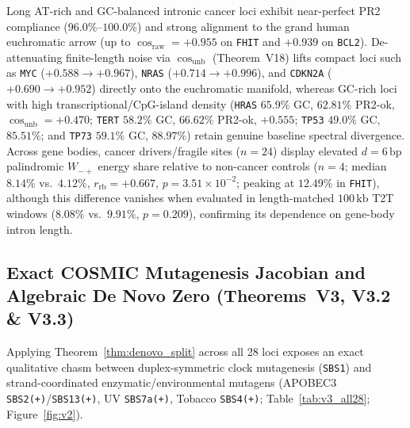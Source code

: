 \documentclass[11pt, a4paper]{article}
\DeclareRobustCommand{\_}{\textunderscore\allowbreak}
\begin{document}
Long AT-rich and GC-balanced intronic cancer loci exhibit near-perfect PR2 compliance ($96.0\%\text{--}100.0\%$) and strong alignment to the grand human euchromatic arrow (up to $\cos_{\mathrm{raw}} = +0.955$ on \texttt{FHIT} and $+0.939$ on \texttt{BCL2}). De-attenuating finite-length noise via $\cos_{\mathrm{unb}}$ (Theorem~V18) lifts compact loci such as \texttt{MYC} ($+0.588 \to +0.967$), \texttt{NRAS} ($+0.714 \to +0.996$), and \texttt{CDKN2A} ($+0.690 \to +0.952$) directly onto the euchromatic manifold, whereas GC-rich loci with high transcriptional/CpG-island density (\texttt{HRAS} $65.9\%$ GC, $62.81\%$ PR2-ok, $\cos_{\mathrm{unb}} = +0.470$; \texttt{TERT} $58.2\%$ GC, $66.62\%$ PR2-ok, $+0.555$; \texttt{TP53} $49.0\%$ GC, $85.51\%$; and \texttt{TP73} $59.1\%$ GC, $88.97\%$) retain genuine baseline spectral divergence. Across gene bodies, cancer drivers/fragile sites ($n = 24$) display elevated $d = 6\,\mathrm{bp}$ palindromic $W_{-+}$ energy share relative to non-cancer controls ($n = 4$; median $8.14\%$ vs.\ $4.12\%$, $r_{\mathrm{rb}} = +0.667$, $p = 3.51 \times 10^{-2}$; peaking at $12.49\%$ in \texttt{FHIT}), although this difference vanishes when evaluated in length-matched $100\,\mathrm{kb}$ T2T windows ($8.08\%$ vs.\ $9.91\%$, $p = 0.209$), confirming its dependence on gene-body intron length.

\subsection{Exact COSMIC Mutagenesis Jacobian and Algebraic De Novo Zero (Theorems~V3, V3.2 \& V3.3)}

Applying Theorem~\ref{thm:denovo_split} across all 28 loci exposes an exact qualitative chasm between duplex-symmetric clock mutagenesis (\texttt{SBS1}) and strand-coordinated enzymatic/environmental mutagens (APOBEC3 \texttt{SBS2(+)}/\texttt{SBS13(+)}, UV \texttt{SBS7a(+)}, Tobacco \texttt{SBS4(+)}; Table~\ref{tab:v3_all28}; Figure~\ref{fig:v2}).
\end{document}
